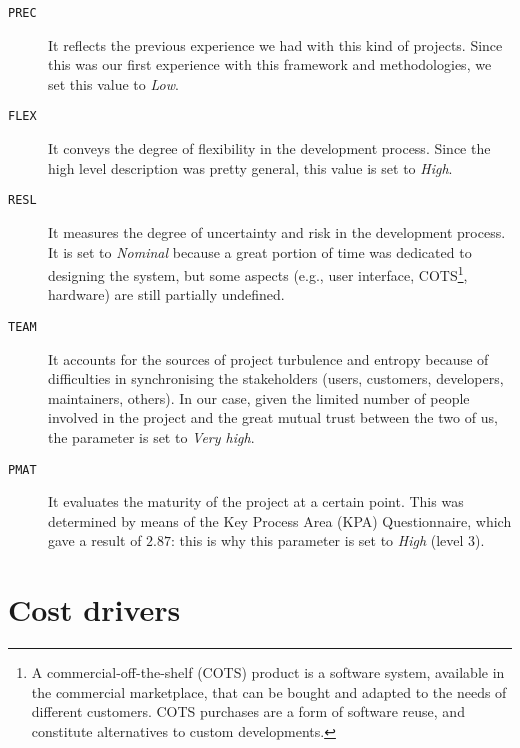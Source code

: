 \begin{description}
	
	
	\item [\normalfont\texttt{PREC}] It reflects the previous experience we had with this kind of projects. Since this was our first experience with this framework and methodologies, we set this value to \emph{Low}.
	
	\item [\normalfont\texttt{FLEX}] It conveys the degree of flexibility in the development process. Since the high level description was pretty general, this value is set to \emph{High}.
	
	\item [\normalfont\texttt{RESL}] It measures the degree of uncertainty and risk in the development process. It is set to \emph{Nominal} because a great portion of time was dedicated to designing the system, but some aspects (e.g., user interface, COTS\footnote{A commercial-off-the-shelf (COTS) product is a software system, available in the commercial marketplace, that can be bought and adapted to the needs of different customers. COTS purchases are a form of software reuse, and constitute alternatives to custom developments.}, hardware) are still partially undefined.
	
	\item [\normalfont\texttt{TEAM}] It accounts for the sources of project turbulence and entropy because of difficulties in synchronising the stakeholders (users, customers, developers, maintainers, others). In our case, given the limited number of people involved in the project and the great mutual trust between the two of us, the parameter is set to \emph{Very high}.
	
	\item [\normalfont\texttt{PMAT}] It evaluates the maturity of the project at a certain point. This was determined by means of the Key Process Area (KPA) Questionnaire, which gave a result of $ 2.87 $: this is why this parameter is set to \emph{High} (level 3).

\end{description}


















\section{Cost drivers}

